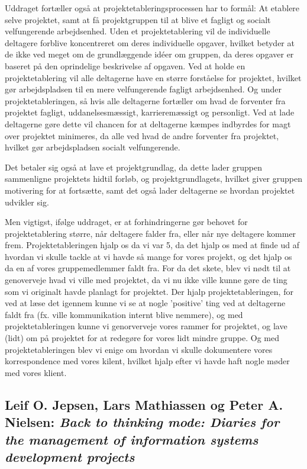 \documentclass[10pt,a4paper,danish]{article}
\begin{document}
Uddraget fortæller også at projektetableringsprocessen har to formål: At etablere selve projektet,  samt at få projektgruppen til at blive et fagligt og socialt velfungerende arbejdsenhed. Uden et projektetablering vil de individuelle deltagere forblive koncentreret om deres individuelle opgaver, hvilket betyder at de ikke ved meget om de grundlæggende idéer om gruppen, da deres opgaver er baseret på den oprindelige beskrivelse af opgaven. Ved at holde en projektetablering vil alle deltagerne have en større forståelse for projektet, hvilket gør arbejdspladsen til en mere velfungerende fagligt arbejdsenhed. Og under projektetableringen, så hvis alle deltagerne fortæller om hvad de forventer fra projektet fagligt, uddanelsesmæssigt, karrieremæssigt og personligt. Ved at lade deltagerne gøre dette vil chancen for at deltagerne kæmpes indbyrdes for magt over projektet minimeres, da alle ved hvad de andre forventer fra projektet, hvilket gør arbejdspladsen socialt velfungerende.

Det betaler sig også at lave et projektgrundlag, da dette lader gruppen sammenligne projektets hidtil forløb, og projektgrundlagets, hvilket giver gruppen motivering for at fortsætte, samt det også lader deltagerne se hvordan projektet udvikler sig.

Men vigtigst, ifølge uddraget, er at forhindringerne gør behovet for projektetablering større, når deltagere falder fra, eller når nye deltagere kommer frem. Projektetableringen hjalp os da vi var 5, da det hjalp os med at finde ud af hvordan vi skulle tackle at vi havde så mange for vores projekt, og det hjalp os da en af vores gruppemedlemmer faldt fra. For da det skete, blev vi nødt til at genoverveje hvad vi ville med projektet, da vi nu ikke ville kunne gøre de ting som vi originalt havde planlagt for projektet. Der hjalp projektetableringen, for ved at læse det igennem kunne vi se at nogle 'positive' ting ved at deltagerne faldt fra (fx. ville kommunikation internt blive nemmere), og med projektetableringen kunne vi genorverveje vores rammer for projektet, og lave (lidt) om på projektet for at redegøre for vores lidt mindre gruppe. Og med projektetableringen blev vi enige om hvordan vi skulle dokumentere vores korrespondence med vores kilent, hvilket hjalp efter vi havde haft nogle møder med vores klient.

\subsection{Leif O. Jepsen, Lars Mathiassen og Peter A. Nielsen: \emph{Back to thinking mode: Diaries for the management of information systems development projects}}
\end{document}
